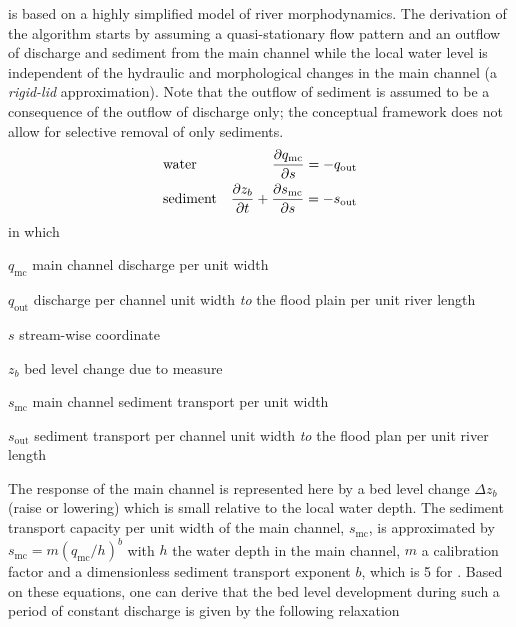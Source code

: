 \dfastmi is based on a highly simplified model of river morphodynamics.
The derivation of the algorithm starts by assuming a quasi-stationary flow pattern and an outflow of discharge and sediment from the main channel while the local water level is independent of the hydraulic and morphological changes in the main channel (a \emph{rigid-lid} approximation).
Note that the outflow of sediment is assumed to be a consequence of the outflow of discharge only; the conceptual framework does not allow for selective removal of only sediments.
%
\begin{align}
&\text{water} & \pdiff{q_\text{mc}}{s} = -q_\text{out} \label{Eq:MassConcWater} \\
&\text{sediment} & \pdiff{z_b}{t} + \pdiff{s_\text{mc}}{s} = -s_\text{out} \label{Eq:MassConcWater}
\end{align}
%
in which
%
\begin{symbollist}
\item[$q_\text{mc}$] main channel discharge per unit width 
\item[$q_\text{out}$] discharge per channel unit width \emph{to} the flood plain per unit river length 
\item[$s$] stream-wise coordinate 
\item[$z_b$] bed level change due to measure 
\item[$s_\text{mc}$] main channel sediment transport per unit width 
\item[$s_\text{out}$] sediment transport per channel unit width \emph{to} the flood plan per unit river length 
\end{symbollist}
%
The response of the main channel is represented here by a bed level change $\Delta z_b$  (raise or lowering) which is small relative to the local water depth.
The sediment transport capacity per unit width of the main channel, $s_\text{mc}$, is approximated by $s_\text{mc} = m \left ( q_\text{mc} / h \right )^b$ with $h$ the water depth  in the main channel, $m$ a calibration factor  and a dimensionless sediment transport exponent $b$, which is 5 for \citet{Engelundh67}.
Based on these equations, one can derive that the bed level development during such a period of constant discharge is given by the following relaxation
